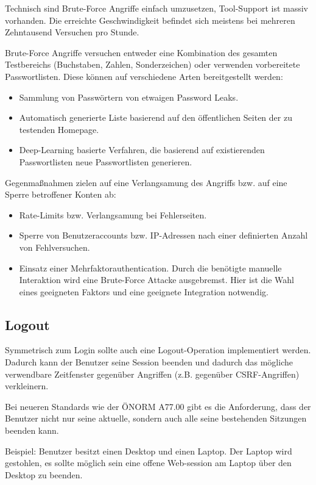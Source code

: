 Technisch sind Brute-Force Angriffe einfach umzusetzen, Tool-Support ist massiv vorhanden. Die erreichte Geschwindigkeit befindet sich meistens bei mehreren Zehntausend Versuchen pro Stunde.

Brute-Force Angriffe versuchen entweder eine Kombination des gesamten Testbereichs (Buchstaben, Zahlen, Sonderzeichen) oder verwenden vorbereitete Passwortlisten. Diese können auf verschiedene Arten bereitgestellt werden:

\begin{itemize}
	\item Sammlung von Passwörtern von etwaigen Password Leaks.
	\item Automatisch generierte Liste basierend auf den öffentlichen Seiten der zu testenden Homepage.
	\item Deep-Learning basierte Verfahren, die basierend auf existierenden Passwortlisten neue Passwortlisten generieren.
\end{itemize}

Gegenmaßnahmen zielen auf eine Verlangsamung des Angriffs bzw. auf eine Sperre betroffener Konten ab:

\begin{itemize}
	\item Rate-Limits bzw. Verlangsamung bei Fehlerseiten.
	\item Sperre von Benutzeraccounts bzw. IP-Adressen nach einer definierten Anzahl von Fehlversuchen.
	\item Einsatz einer Mehrfaktorauthentication. Durch die benötigte manuelle Interaktion wird eine Brute-Force Attacke ausgebremst. Hier ist die Wahl eines geeigneten Faktors und eine geeignete Integration notwendig.
\end{itemize}

\subsection{Logout}

Symmetrisch zum Login sollte auch eine Logout-Operation implementiert werden. Dadurch kann der Benutzer seine Session beenden und dadurch das mögliche verwendbare Zeitfenster gegenüber Angriffen (z.B. gegenüber CSRF-Angriffen) verkleinern.

Bei neueren Standards wie der ÖNORM A77.00 gibt es die Anforderung, dass der Benutzer nicht nur seine aktuelle, sondern auch alle seine bestehenden Sitzungen beenden kann.

Beispiel: Benutzer besitzt einen Desktop und einen Laptop. Der Laptop wird gestohlen, es sollte möglich sein eine offene Web-session am Laptop über den Desktop zu beenden.

